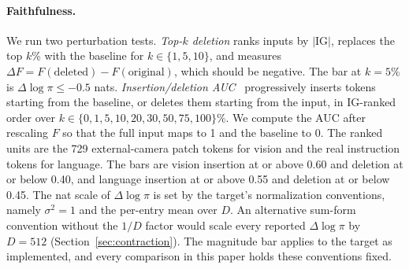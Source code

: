 \documentclass{article}
\begin{document}
\paragraph{Faithfulness.}
We run two perturbation tests.
\emph{Top-$k$ deletion} ranks inputs by $|\mathrm{IG}|$, replaces the top $k\%$ with the baseline for $k \in \{1, 5, 10\}$, and measures $\Delta F = F(\text{deleted}) - F(\text{original})$, which should be negative.
The bar at $k{=}5\%$ is $\Delta\log\pi \leq -0.5$ nats.
\emph{Insertion/deletion AUC}~\cite{petsiuk2018rise} progressively inserts tokens starting from the baseline, or deletes them starting from the input, in IG-ranked order over $k \in \{0, 1, 5, 10, 20, 30, 50, 75, 100\}\%$.
We compute the AUC after rescaling $F$ so that the full input maps to 1 and the baseline to 0.
The ranked units are the 729 external-camera patch tokens for vision and the real instruction tokens for language.
The bars are vision insertion at or above 0.60 and deletion at or below 0.40, and language insertion at or above 0.55 and deletion at or below 0.45.
The nat scale of $\Delta\log\pi$ is set by the target's normalization conventions, namely $\sigma^2{=}1$ and the per-entry mean over $D$.
An alternative sum-form convention without the $1/D$ factor would scale every reported $\Delta\log\pi$ by $D{=}512$ (Section~\ref{sec:contraction}).
The magnitude bar applies to the target as implemented, and every comparison in this paper holds these conventions fixed.
\end{document}
